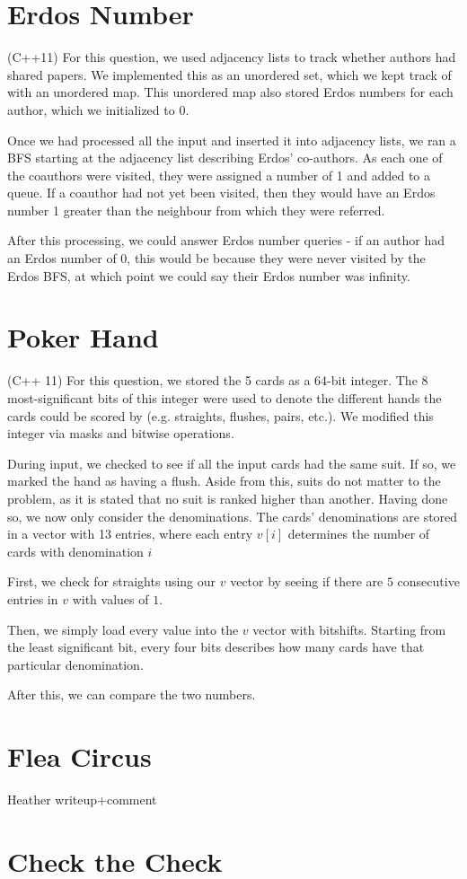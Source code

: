 \documentclass{article}
\begin{document}
\section{Erdos Number}
(C++11) For this question, we used adjacency lists to track whether authors had shared papers. We implemented this as an unordered set, which we kept track of with an unordered map. This unordered map also stored Erdos numbers for each author, which we initialized to 0.
\par
Once we had processed all the input and inserted it into adjacency lists, we ran a BFS starting at the adjacency list describing Erdos' co-authors. As each one of the coauthors were visited, they were assigned a number of 1 and added to a queue. If a coauthor had not yet been visited, then they would have an Erdos number 1 greater than the neighbour from which they were referred.
\par
After this processing, we could answer Erdos number queries - if an author had an Erdos number of 0, this would be because they were never visited by the Erdos BFS, at which point we could say their Erdos number was infinity.

\section{Poker Hand}
(C++ 11) For this question, we stored the 5 cards as a 64-bit integer. The 8 most-significant bits of this integer were used to denote the different hands the cards could be scored by (e.g. straights, flushes, pairs, etc.). We modified this integer via masks and bitwise operations.
\par
During input, we checked to see if all the input cards had the same suit. If so, we marked the hand as having a flush. Aside from this, suits do not matter to the problem, as it is stated that no suit is ranked higher than another. Having done so, we now only consider the denominations. The cards' denominations are stored in a vector with 13 entries, where each entry $v[i]$ determines the number of cards with denomination $i$

First, we check for straights using our $v$ vector by seeing if there are $5$ consecutive entries in $v$ with values of $1$.

Then, we simply load every value into the $v$ vector with bitshifts. Starting from the least significant bit, every four bits describes how many cards have that particular denomination.

After this, we can compare the two numbers.


\section{Flea Circus}
Heather writeup+comment

\section{Check the Check}
\end{document}
